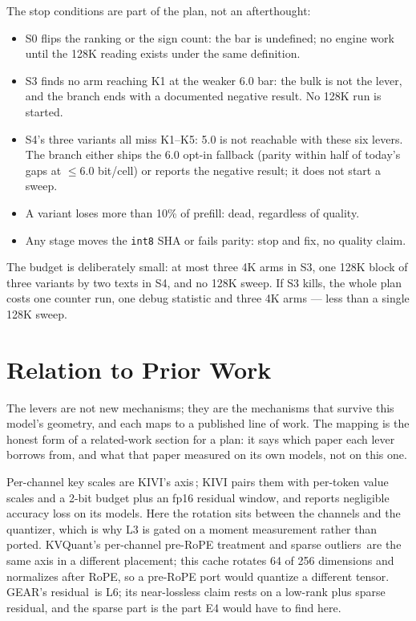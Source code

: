 \documentclass[10pt,twocolumn]{article}
\begin{document}
The stop conditions are part of the plan, not an afterthought:

\begin{itemize}[leftmargin=1.2em,itemsep=0.15em,topsep=0.2em]
\item S0 flips the ranking or the sign count: the bar is undefined; no engine work until the 128K reading exists under the same definition.
\item S3 finds no arm reaching K1 at the weaker 6.0 bar: the bulk is not the lever, and the branch ends with a documented negative result. No 128K run is started.
\item S4's three variants all miss K1--K5: 5.0 is not reachable with these six levers. The branch either ships the 6.0 opt-in fallback (parity within half of today's gaps at $\le 6.0$ bit/cell) or reports the negative result; it does not start a sweep.
\item A variant loses more than 10\% of prefill: dead, regardless of quality.
\item Any stage moves the \texttt{int8} SHA or fails parity: stop and fix, no quality claim.
\end{itemize}

The budget is deliberately small: at most three 4K arms in S3, one 128K block of three variants by two texts in S4, and no 128K sweep. If S3 kills, the whole plan costs one counter run, one debug statistic and three 4K arms --- less than a single 128K sweep.

\section{Relation to Prior Work}\label{sec:prior}

The levers are not new mechanisms; they are the mechanisms that survive this model's geometry, and each maps to a published line of work. The mapping is the honest form of a related-work section for a plan: it says which paper each lever borrows from, and what that paper measured on its own models, not on this one.

Per-channel key scales are KIVI's axis\,\cite{kivi}; KIVI pairs them with per-token value scales and a 2-bit budget plus an fp16 residual window, and reports negligible accuracy loss on its models. Here the rotation sits between the channels and the quantizer, which is why L3 is gated on a moment measurement rather than ported. KVQuant's per-channel pre-RoPE treatment and sparse outliers\,\cite{kvquant} are the same axis in a different placement; this cache rotates 64 of 256 dimensions and normalizes after RoPE, so a pre-RoPE port would quantize a different tensor. GEAR's residual\,\cite{gear} is L6; its near-lossless claim rests on a low-rank plus sparse residual, and the sparse part is the part E4 would have to find here.
\end{document}
